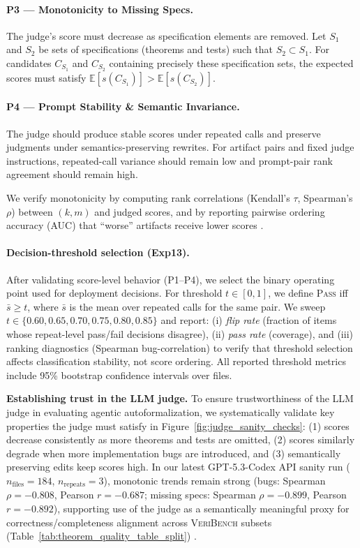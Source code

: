 \documentclass{article}
\begin{document}
\paragraph{P3 — Monotonicity to Missing Specs.}
The judge’s score must decrease as specification elements are removed.
Let $S_1$ and $S_2$ be sets of specifications (theorems and tests) such that $S_2 \subset S_1$.
For candidates $C_{S_1}$ and $C_{S_2}$ containing precisely these specification sets, the expected scores must satisfy $\mathbb{E}[s(C_{S_1})] > \mathbb{E}[s(C_{S_2})]$.

\paragraph{P4 — Prompt Stability \& Semantic Invariance.}
The judge should produce stable scores under repeated calls and preserve judgments under semantics-preserving rewrites.
For artifact pairs and fixed judge instructions, repeated-call variance should remain low and prompt-pair rank agreement should remain high.

We verify monotonicity by computing rank correlations (Kendall's $\tau$, Spearman's $\rho$) between $(k,m)$ and judged scores, and by reporting pairwise ordering accuracy (AUC) that “worse'' artifacts receive lower scores \citep{TongZhang2024CodeJudge,Zhuo2024ICEScore}.

\paragraph{Decision-threshold selection (Exp13).}
After validating score-level behavior (P1--P4), we select the binary operating point used for deployment decisions.
For threshold $t\in[0,1]$, we define \textsc{Pass} iff $\bar{s}\ge t$, where $\bar{s}$ is the mean over repeated calls for the same pair.
We sweep $t\in\{0.60,0.65,0.70,0.75,0.80,0.85\}$ and report:
(i) \emph{flip rate} (fraction of items whose repeat-level pass/fail decisions disagree),
(ii) \emph{pass rate} (coverage),
and (iii) ranking diagnostics (Spearman bug-correlation) to verify that threshold selection affects classification stability, not score ordering.
All reported threshold metrics include 95\% bootstrap confidence intervals over files.

\textbf{Establishing trust in the LLM judge.} To ensure trustworthiness of the LLM judge in evaluating agentic autoformalization, we systematically validate key properties the judge must satisfy in Figure~\ref{fig:judge_sanity_checks}: (1) scores decrease consistently as more theorems and tests are omitted, (2) scores similarly degrade when more implementation bugs are introduced, and (3) semantically preserving edits keep scores high.
In our latest GPT-5.3-Codex API sanity run (\(n_\text{files}=184\), \(n_\text{repeats}=3\)), monotonic trends remain strong (bugs: Spearman \(\rho=-0.808\), Pearson \(r=-0.687\); missing specs: Spearman \(\rho=-0.899\), Pearson \(r=-0.892\)), supporting use of the judge as a semantically meaningful proxy for correctness/completeness alignment across \textsc{VeriBench} subsets (Table~\ref{tab:theorem_quality_table_split}) \citep{Li2024TrustLLMJudgments,Kocmi2024HumanVsLLM}.
\end{document}
